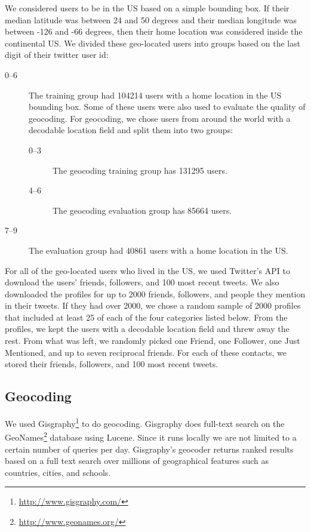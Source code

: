 \documentclass{sig-alternate}
\begin{document}
We considered users to be in the US based on a simple bounding box.  If their median latitude was between 24 and 50 degrees and their median longitude was between -126 and -66 degrees, then their home location was considered inside the continental US.
We divided these geo-located users into groups based on the last digit of their twitter user id:
\begin{description}
\item[0--6] The training group had 104214 users with a home location in the US bounding box. Some of these users were also used to evaluate the quality of geocoding. For geocoding, we chose users from around the world with a decodable location field and split them into two groups:
\begin{description}
\item[0--3] The geocoding training group has 131295 users.
\item[4--6] The geocoding evaluation group has 85664 users.
\end{description}
\item[7--9] The evaluation group had 40861 users with a home location in the US.
\end{description}

For all of the geo-located users who lived in the US, we used Twitter's API to download the users' friends, followers, and 100 most recent tweets.
We also downloaded the profiles for up to 2000 friends, followers, and people they mention in their tweets. If they had over 2000, we chose a random sample of 2000 profiles that included at least 25 of each of the four categories listed below.
From the profiles, we kept the users with a decodable location field and threw away the rest. From what was left, we randomly picked one Friend, one Follower, one Just Mentioned, and up to seven reciprocal friends.
For each of these contacts, we stored their friends, followers, and 100 most recent tweets.

\subsection{Geocoding}
We used Gisgraphy\footnote{\url{http://www.gisgraphy.com/}} to do geocoding.
Gisgraphy does full-text search on the GeoNames\footnote{\url{http://www.geonames.org/}}
database using Lucene. Since
it runs locally we are not limited to a certain number of queries per day.
Gisgraphy's geocoder returns ranked results based on a full text search
over millions of geographical features such as countries, cities, and schools. 
\end{document}
